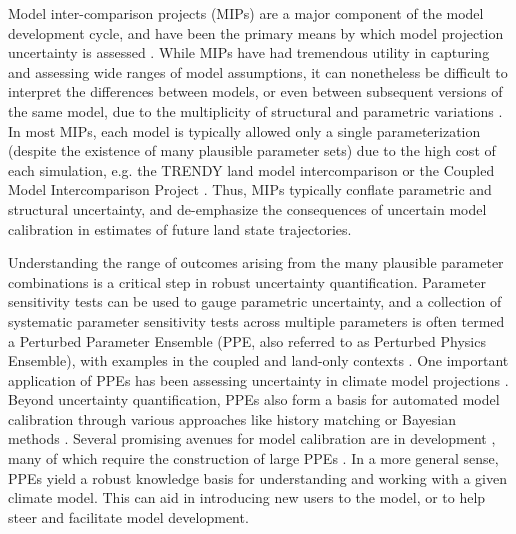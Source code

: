 \documentclass[draft]{agujournal2019}
\begin{document}
Model inter-comparison projects (MIPs) are a major component of the model development cycle, and have been the primary means by which model projection uncertainty is assessed \cite{henderson-sellers1995,pitman1999,wood1998,schlosser2000,eyring2016,friedlingstein2022}. While MIPs have had tremendous utility in capturing and assessing wide ranges of model assumptions, it can nonetheless be difficult to interpret the differences between models, or even between subsequent versions of the same model, due to the multiplicity of structural and parametric variations \cite{mcneall2016}. In most MIPs, each model is typically allowed only a single parameterization (despite the existence of many plausible parameter sets) due to the high cost of each simulation, e.g. the TRENDY land model intercomparison \cite{sitch2024} or the Coupled Model Intercomparison Project \cite{eyring2016}. Thus, MIPs typically conflate parametric and structural uncertainty, and de-emphasize the consequences of uncertain model calibration in estimates of future land state trajectories. 

Understanding the range of outcomes arising from the many plausible parameter combinations is a critical step in robust uncertainty quantification. Parameter sensitivity tests can be used to gauge parametric uncertainty, and a collection of systematic parameter sensitivity tests across multiple parameters is often termed a Perturbed Parameter Ensemble (PPE, also referred to as Perturbed Physics Ensemble), with examples in the coupled \cite{murphy2004} and land-only contexts \cite{dagon2020,mcneall2024}. 
One important application of PPEs has been assessing uncertainty in climate model projections \cite{murphy2004,sanderson2008,booth2012,hawkins2019,yamazaki2021,peatier2022,tett2022}.
Beyond uncertainty quantification, PPEs also form a basis for automated model calibration through various approaches like history matching \cite{williamson2013,williamson2017,hourdin2020,couvreux2021,mcneall2024} or Bayesian methods \cite{cleary2021}.
Several promising avenues for model calibration are in development \cite{pinnington2020,cleary2021,alonso-gonzalez2022}, many of which require the construction of large PPEs \cite{qian2018}.
In a more general sense, PPEs yield a robust knowledge basis for understanding and working with a given climate model. This can aid in introducing new users to the model, or to help steer and facilitate model development.
\end{document}
